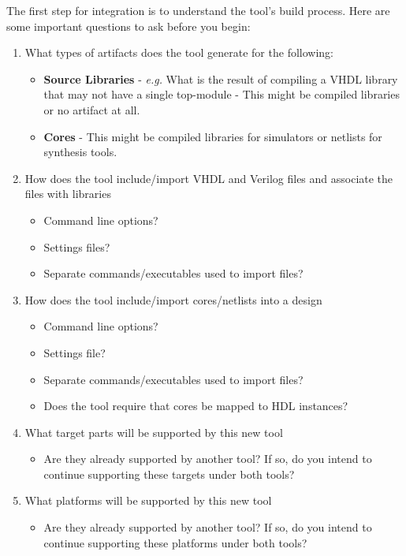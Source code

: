 The first step for integration is to understand the tool's build process. Here are some important questions to ask before you begin:
\begin{enumerate}
\item What types of artifacts does the tool generate for the following:
	\begin{itemize}
	\item \textbf{Source Libraries}
	\subitem - \textit{e.g.} What is the result of compiling a VHDL library that may not have a single top-module
	\subitem - This might be compiled libraries or no artifact at all.
	\item \textbf{Cores}
	\subitem - This might be compiled libraries for simulators or netlists for synthesis tools.
	\end{itemize}
\item How does the tool include/import VHDL and Verilog files and associate the files with libraries
	\begin{itemize}
	\item Command line options?
	\item Settings files?
	\item Separate commands/executables used to import files?
	\end{itemize}
\item How does the tool include/import cores/netlists into a design
	\begin{itemize}
	\item Command line options?
	\item Settings file?
	\item Separate commands/executables used to import files?
	\item Does the tool require that cores be mapped to HDL instances?
	\end{itemize}
    \item What target parts will be supported by this new tool
	\begin{itemize}
	\item Are they already supported by another tool? If so, do you intend to continue supporting these targets under both tools?
	\end{itemize}
    \item What platforms will be supported by this new tool
	\begin{itemize}
	\item Are they already supported by another tool? If so, do you intend to continue supporting these platforms under both tools?
	\end{itemize}

\end{enumerate}
